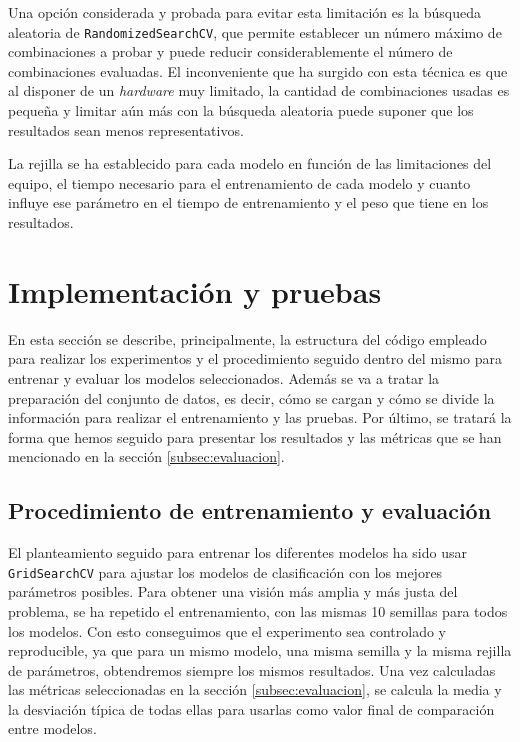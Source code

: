 \vspace{1em}

Una opción considerada y probada para evitar esta limitación es la búsqueda aleatoria de \texttt{RandomizedSearchCV}, que permite establecer un número máximo de combinaciones a probar y puede reducir considerablemente el número de combinaciones evaluadas. El inconveniente que ha surgido con esta técnica es que al disponer de un \textit{hardware} muy limitado, la cantidad de combinaciones usadas es pequeña y limitar aún más con la búsqueda aleatoria puede suponer que los resultados sean menos representativos.

\vspace{1em}

La rejilla se ha establecido para cada modelo en función de las limitaciones del equipo, el tiempo necesario para el entrenamiento de cada modelo y cuanto influye ese parámetro en el tiempo de entrenamiento y el peso que tiene en los resultados.

\section{Implementación y pruebas}
\label{sec:implementacion}

En esta sección se describe, principalmente, la estructura del código empleado para realizar los experimentos y el procedimiento seguido dentro del mismo para entrenar y evaluar los modelos seleccionados. Además se va a tratar la preparación del conjunto de datos, es decir, cómo se cargan y cómo se divide la información para realizar el entrenamiento y las pruebas. Por último, se tratará la forma que hemos seguido para presentar los resultados y las métricas que se han mencionado en la sección \ref{subsec:evaluacion}.

\subsection{Procedimiento de entrenamiento y evaluación}
\label{subsec:procedimiento}

El planteamiento seguido para entrenar los diferentes modelos ha sido usar \texttt{GridSearchCV} para ajustar los modelos de clasificación con los mejores parámetros posibles. Para obtener una visión más amplia y más justa del problema, se ha repetido el entrenamiento, con las mismas 10 semillas para todos los modelos. Con esto conseguimos que el experimento sea controlado y reproducible, ya que para un mismo modelo, una misma semilla y la misma rejilla de parámetros, obtendremos siempre los mismos resultados. Una vez calculadas las métricas seleccionadas en la sección \ref{subsec:evaluacion}, se calcula la media y la desviación típica de todas ellas para usarlas como valor final de comparación entre modelos.

